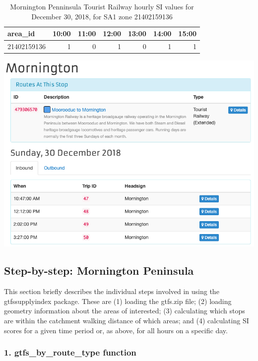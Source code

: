\documentclass[preprint, 3p,
authoryear]{elsarticle} %
\begin{document}
\begin{table}

\caption{\label{tab:mornington_hand_check}Mornington Penninsula Tourist Railway hourly SI values for December 30, 2018, for SA1 zone 21402159136}
\centering
\begin{tabular}[t]{l|r|r|r|r|r|r}
\hline
area\_id & 10:00 & 11:00 & 12:00 & 13:00 & 14:00 & 15:00\\
\hline
21402159136 & 1 & 0 & 1 & 0 & 1 & 1\\
\hline
\end{tabular}
\end{table}

\includegraphics[width=10.56in]{graphics/mornington_arrivals}

\hypertarget{step-by-step-mornington-peninsula}{%
\subsection{Step-by-step: Mornington
Peninsula}\label{step-by-step-mornington-peninsula}}

This section briefly describes the individual steps involved in using
the gtfssupplyindex package. These are (1) loading the gtfs.zip file;
(2) loading geometry information about the areas of interested; (3)
calculating which stops are within the catchment walking distance of
which areas; and (4) calculating SI scores for a given time period or,
as above, for all hours on a specific day.

\hypertarget{gtfs_by_route_type-function}{%
\subsubsection{1. gtfs\_by\_route\_type
function}\label{gtfs_by_route_type-function}}
\end{document}
